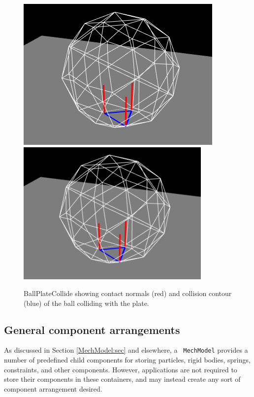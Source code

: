 \begin{figure}[ht]
\begin{center}
\iflatexml
 \includegraphics[]{images/BallPlateCollide}
\else
 \includegraphics[width=3.75in]{images/BallPlateCollide}
\fi
\end{center}
\caption{BallPlateCollide showing contact normals (red) and collision contour
(blue) of the ball colliding with the plate.}
\label{BallPlateCollide:fig}
\end{figure}

\subsection{General component arrangements}

As discussed in Section \ref{MechModel:sec} and elsewhere, a {\tt
MechModel} provides a number of predefined child components for
storing particles, rigid bodies, springs, constraints, and other
components.  However, applications are not required to store their
components in these containers, and may instead create any sort of
component arrangement desired.

